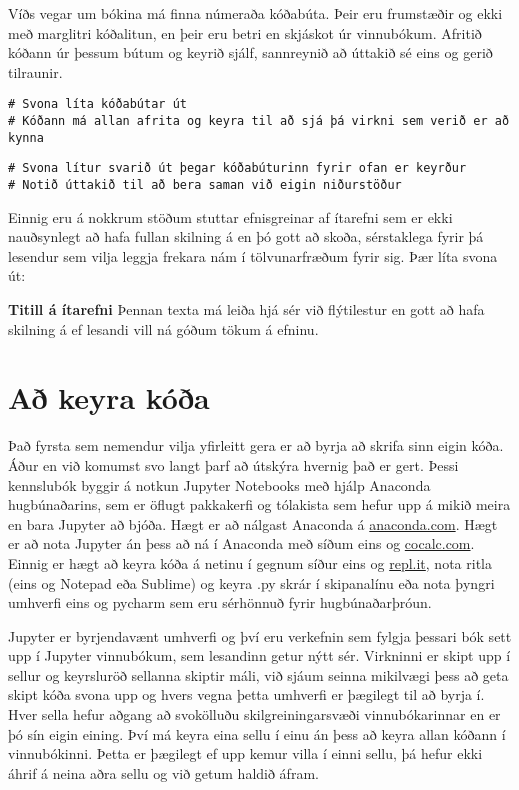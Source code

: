 Víðs vegar um bókina má finna númeraða kóðabúta.
Þeir eru frumstæðir og ekki með marglitri kóðalitun, en þeir eru betri en skjáskot úr vinnubókum.
Afritið kóðann úr þessum bútum og keyrið sjálf, sannreynið að úttakið sé eins og gerið tilraunir.
\lstset{style=uttak}
\lstset{style=venjulegt}
\begin{lstlisting}[caption=Kóðabútar kynntir til sögunnar]
# Svona líta kóðabútar út
# Kóðann má allan afrita og keyra til að sjá þá virkni sem verið er að kynna
\end{lstlisting}
\lstset{style=uttak}
\begin{lstlisting}
# Svona lítur svarið út þegar kóðabúturinn fyrir ofan er keyrður
# Notið úttakið til að bera saman við eigin niðurstöður
\end{lstlisting}
\lstset{style=venjulegt}

Einnig eru á nokkrum stöðum stuttar efnisgreinar af ítarefni sem er ekki nauðsynlegt að hafa fullan skilning á en þó gott að skoða, sérstaklega fyrir þá lesendur sem vilja leggja frekara nám í tölvunarfræðum fyrir sig.
Þær líta svona út:

\begin{itarefni}
\textbf{Titill á ítarefni}
Þennan texta má leiða hjá sér við flýtilestur en gott að hafa skilning á ef lesandi vill ná góðum tökum á efninu.
\end{itarefni}

\section{Að keyra kóða}\label{uk:keyra-koda}

Það fyrsta sem nemendur vilja yfirleitt gera er að byrja að skrifa sinn eigin kóða. 
Áður en við komumst svo langt þarf að útskýra hvernig það er gert. 
Þessi kennslubók byggir á notkun Jupyter Notebooks með hjálp Anaconda hugbúnaðarins, sem er öflugt pakkakerfi og tólakista sem hefur upp á mikið meira en bara Jupyter að bjóða. 
Hægt er að nálgast Anaconda á \href{www.anaconda.com}{anaconda.com}.
Hægt er að nota Jupyter án þess að ná í Anaconda með síðum eins og \href{www.cocalc.com}{cocalc.com}. 
Einnig er hægt að keyra kóða á netinu í gegnum síður eins og \href{www.repl.it}{repl.it}, nota ritla (eins og Notepad eða Sublime) og keyra .py skrár í skipanalínu eða nota þyngri umhverfi eins og pycharm sem eru sérhönnuð fyrir hugbúnaðarþróun.

Jupyter er byrjendavænt umhverfi og því eru verkefnin sem fylgja þessari bók sett upp í Jupyter vinnubókum, sem lesandinn getur nýtt sér. 
Virkninni er skipt upp í sellur og keyrsluröð sellanna skiptir máli, við sjáum seinna mikilvægi þess að geta skipt kóða svona upp og hvers vegna þetta umhverfi er þægilegt til að byrja í. 
Hver sella hefur aðgang að svokölluðu skilgreiningarsvæði vinnubókarinnar en er þó sín eigin eining.
Því má keyra eina sellu í einu án þess að keyra allan kóðann í vinnubókinni.
Þetta er þægilegt ef upp kemur villa í einni sellu, þá hefur ekki áhrif á neina aðra sellu og við getum haldið áfram.

